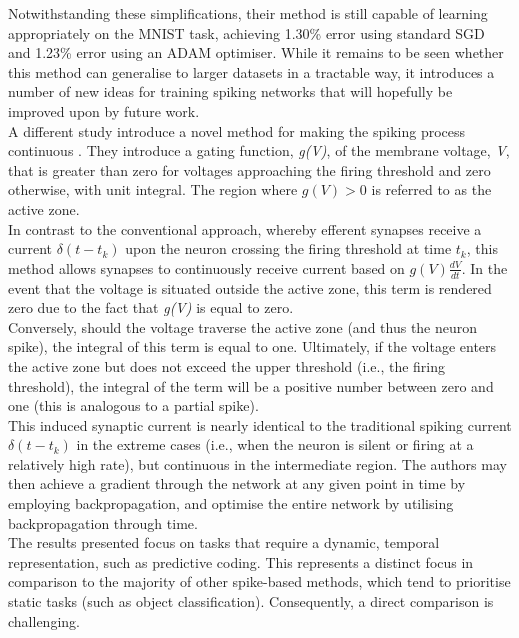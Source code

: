 \noindent Notwithstanding these simplifications, their method is still capable of learning appropriately on the MNIST task, achieving 1.30\% error using standard SGD and 1.23\% error using an ADAM optimiser. While it remains to be seen whether this method can generalise to larger datasets in a tractable way, it introduces a number of new ideas for training spiking networks that will hopefully be improved upon by future work. \\

\noindent A different study introduce a novel method for making the spiking process continuous \cite{huh2018gradient}. They introduce a gating function, \textit{g(V)}, of the membrane voltage, \textit{V}, that is greater than zero for voltages approaching the firing threshold and zero otherwise, with unit integral. The region where $g(V) > 0$ is referred to as the active zone. \\

\noindent In contrast to the conventional approach, whereby efferent synapses receive a current $\delta (t - t_k)$ upon the neuron crossing the firing threshold at time $t_k$, this method allows synapses to continuously receive current based on $g(V)\frac{dV}{dt}$. In the event that the voltage is situated outside the active zone, this term is rendered zero due to the fact that \textit{g(V)} is equal to zero. \\

\noindent Conversely, should the voltage traverse the active zone (and thus the neuron spike), the integral of this term is equal to one. Ultimately, if the voltage enters the active zone but does not exceed the upper threshold (i.e., the firing threshold), the integral of the term will be a positive number between zero and one (this is analogous to a partial spike). \\

\noindent This induced synaptic current is nearly identical to the traditional spiking current $\delta (t - t_k)$ in the extreme cases (i.e., when the neuron is silent or firing at a relatively high rate), but continuous in the intermediate region. The authors may then achieve a gradient through the network at any given point in time by employing backpropagation, and optimise the entire network by utilising backpropagation through time.\\

\noindent The results presented focus on tasks that require a dynamic, temporal representation, such as predictive coding. This represents a distinct focus in comparison to the majority of other spike-based methods, which tend to prioritise static tasks (such as object classification). Consequently, a direct comparison is challenging. \\

